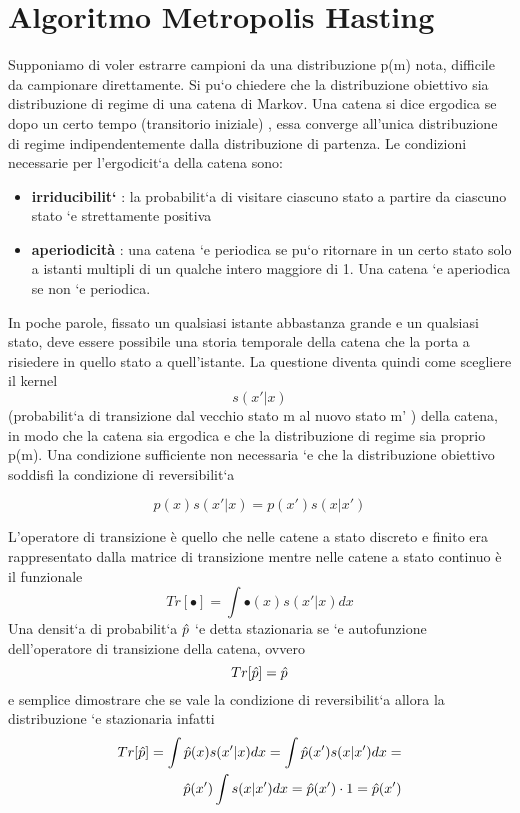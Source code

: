 \chapter{Algoritmo Metropolis Hasting}
Supponiamo di voler estrarre campioni da una distribuzione p(m) nota, difficile da
campionare direttamente.
Si pu`o chiedere che la distribuzione obiettivo sia
distribuzione di regime di una catena di Markov. Una catena si dice ergodica se
dopo un certo tempo (transitorio iniziale) , essa converge all'unica distribuzione
di regime indipendentemente dalla distribuzione di partenza.
Le condizioni necessarie per l’ergodicit`a della catena sono:
\begin{itemize}
\item \textbf{irriducibilit`} : la probabilit`a di visitare ciascuno stato a partire da ciascuno
stato `e strettamente positiva
\item \textbf{aperiodicità} : una catena `e periodica se pu`o ritornare in un certo stato solo
a istanti multipli di un qualche intero maggiore di 1. Una catena `e aperiodica
se non `e periodica.
\end{itemize}

In poche parole, fissato un qualsiasi istante abbastanza grande e un qualsiasi stato,
deve essere possibile una storia temporale della catena che la porta a risiedere in
quello stato a quell’istante. La questione diventa quindi come scegliere il kernel
\begin{equation*}
s(x' |x) 
\end{equation*}
(probabilit`a di transizione dal vecchio stato m al nuovo stato m' ) della catena,
in modo che la catena sia ergodica e che la distribuzione di regime sia proprio p(m).
Una condizione sufficiente non necessaria `e che la distribuzione obiettivo soddisfi la
condizione di reversibilit`a

\begin{equation}
p(x)s(x' |x) = p(x')s(x|x' )
\end{equation}

L'operatore di transizione è quello che nelle catene a stato discreto e finito era rappresentato dalla matrice di transizione mentre nelle catene a stato continuo è il funzionale
\begin{equation}
Tr[\bullet]=\int \bullet(x)s(x'|x)dx
\end{equation}
Una  densit`a di probabilit`a $\hat{p}$ `e detta stazionaria se `e autofunzione
dell’operatore di transizione della catena, ovvero\\
\begin{equation}
Tr[\hat{p}]=\hat{p}
\end{equation}
e semplice dimostrare che se vale la condizione di reversibilit`a allora la distribuzione
`e stazionaria infatti
\begin{equation*}
\begin{split}
Tr[\hat{p}]=\int \hat{p}(x)s(x'|x)dx=\int \hat{p}(x')s(x|x')dx=\\
\hat{p}(x')\int s(x|x')dx=\hat{p}(x')\cdot 1=\hat{p}(x')
\end{split}
\end{equation*}

